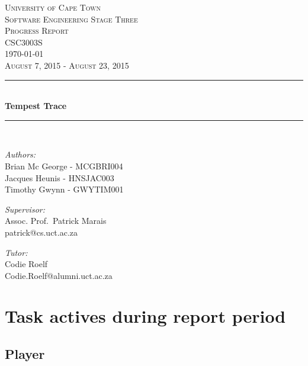 \documentclass[a4paper,10pt]{article}
\begin{document}
\begin{titlepage} \begin{center} 
		\textsc{\LARGE University of Cape Town}
		\\[1.5cm] \textsc{\Large Software Engineering Stage Three} \\\smallskip
        \textsc{\Large Progress Report} \\\smallskip
        \textsc{\Large CSC3003S} \\\smallskip
        \textsc{\Large \today} \\\smallskip
        \textsc{\Large August 7, 2015 - August 23, 2015}
		\\[0.5cm]
		\noindent\rule[0.4mm]{\textwidth}{0.1mm}
		\\[0.4cm] { \huge \bfseries Tempest Trace \\[0.4cm] }
		\noindent\rule[0.4mm]{\textwidth}{0.1mm}
		\\[1cm]
		\begin{minipage}[t]{0.4\textwidth}
		\begin{flushleft}\large \emph{Authors:}\\ Brian Mc George - MCGBRI004 \\ Jacques Heunis - HNSJAC003 \\ Timothy Gwynn - GWYTIM001
        \\[2cm]
            \end{flushleft}
		 \end{minipage} \begin{minipage}[t]{0.4\textwidth} 
		\begin{flushright} \large \emph{Supervisor:} \\ Assoc. Prof.~Patrick Marais\\patrick@cs.uct.ac.za\end{flushright}
		\begin{flushright} \large \emph{Tutor:} \\ Codie Roelf\\Codie.Roelf@alumni.uct.ac.za\end{flushright}
		 \end{minipage} 
		\end{center}
		\end{titlepage}
\newpage
\tableofcontents
\newpage

\section{Task actives during report period}
\subsection{Player}
\end{document}
